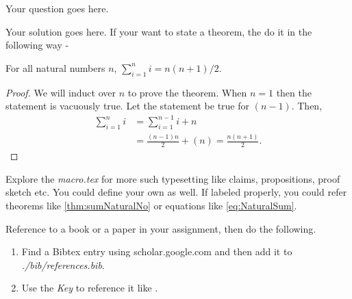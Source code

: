 \documentclass[12pt]{article}
\begin{document}
    \noindent
    
    \onehalfspace

    \begin{question}
        Your question goes here. 
    \end{question}

    \begin{solution}
        Your solution goes here. If your want to state a theorem, the do it in the following way - 

        \begin{theorem} \label{thm:sumNaturalNo}
            For all natural numbers $n$, $\sum_{i=1}^n i = n(n+1)/2$.
        \end{theorem}

        \begin{proof}
            We will induct over $n$ to prove the theorem. When $n=1$ then the statement is vacuously true. Let the statement be true for $(n-1)$. Then,
            \begin{align}
                \sum_{i=1}^{n} i &= \sum_{i=1}^{n-1} i + n \\
                &= \frac{(n-1)n}{2} + (n) = \frac{n(n+1)}{2}. \label{eq:NaturalSum}
            \end{align}
        \end{proof}
        
        Explore the \emph{macro.tex} for more such typesetting like claims, propositions, proof sketch etc. You could define your own as well. If labeled properly, you could refer theorems like \autoref{thm:sumNaturalNo} or equations like \autoref{eq:NaturalSum}.

        \noindent Reference to a book or a paper in your assignment, then do the following.
        \begin{enumerate}
            \item Find a Bibtex entry using scholar.google.com and then add it to \emph{./bib/references.bib}.
            \item Use the \emph{Key} to reference it like \cite{RK12}.
        \end{enumerate}
    \end{solution}

    
    
\end{document}
